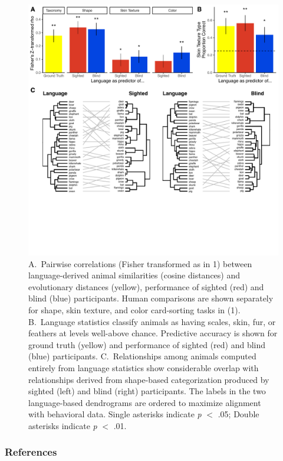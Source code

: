 \documentclass[12pt]{article}
\begin{document}
\begin{figure}[h!]
\centering
     \includegraphics[width=7in]{results/figureppt3.pdf}
      \caption{\footnotesize  A.\ Pairwise correlations (Fisher transformed as in 1) between language-derived animal similarities (cosine distances) and evolutionary distances (yellow), performance of sighted (red) and blind (blue) participants. Human comparisons are shown separately for shape, skin texture, and color card-sorting tasks in (1). B.\ Language statistics classify animals as having scales, skin, fur, or feathers at levels well-above chance. Predictive accuracy is shown for ground truth (yellow) and performance of sighted (red) and blind (blue) participants.  C.\ Relationships among animals computed entirely from language statistics show considerable overlap with relationships derived from shape-based categorization produced by sighted (left) and blind (right) participants. The labels in the two language-based dendrograms are ordered to maximize alignment with behavioral data. Single asterisks indicate \textit{p} $<$  .05; Double asterisks indicate \textit{p} $<$ .01. }
\end{figure}

\subsubsection*{References}
\end{document}
